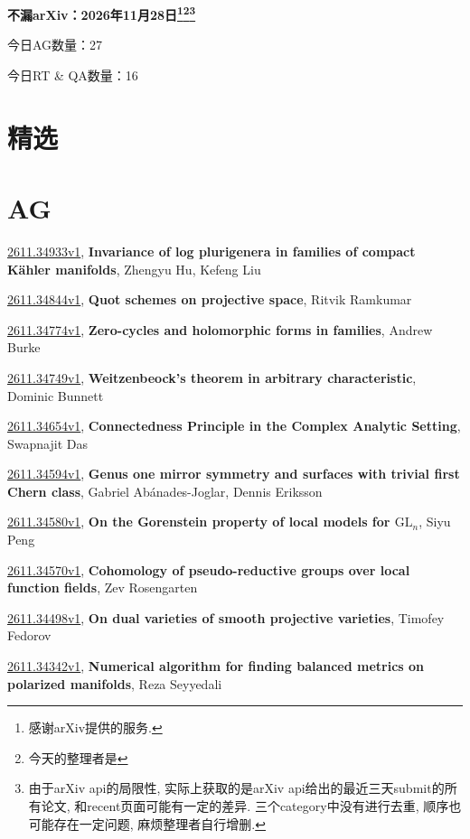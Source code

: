 \documentclass[9pt, a4paper]{article}
\theoremstyle{plain}
\theoremstyle{definition}
\theoremstyle{remark}
\newcommand{\arxiv}[3]{\href{https://arxiv.org/abs/#1}{#1}, \textbf{\textcolor{arxivblue}{#2}}, #3}
\newcommand{\AGnumber}{27}
\newcommand{\RTQAnumber}{16}
\newcommand{\NewestDate}{2026年11月28日}
\newcommand{\todayarXiver}{} %
\begin{document}
\begin{center}
    \Huge\textbf{不漏arXiv：\NewestDate\footnote{感谢arXiv提供的服务.}\footnote{今天的整理者是\todayarXiver}\footnote{由于arXiv api的局限性, 实际上获取的是arXiv api给出的最近三天submit的所有论文, 和recent页面可能有一定的差异. 三个category中没有进行去重, 顺序也可能存在一定问题, 麻烦整理者自行增删.}} \\
\end{center}

\setcounter{section}{-1}

\begin{center}
    今日AG数量：\AGnumber
    
    今日RT \& QA数量：\RTQAnumber
    
\end{center}


\section{精选}


\section{AG}
\arxiv{2611.34933v1}{Invariance of log plurigenera in families of compact Kähler manifolds}{Zhengyu Hu, Kefeng Liu}

\arxiv{2611.34844v1}{Quot schemes on projective space}{Ritvik Ramkumar}

\arxiv{2611.34774v1}{Zero-cycles and holomorphic forms in families}{Andrew Burke}

\arxiv{2611.34749v1}{Weitzenbeock's theorem in arbitrary characteristic}{Dominic Bunnett}

\arxiv{2611.34654v1}{Connectedness Principle in the Complex Analytic Setting}{Swapnajit Das}

\arxiv{2611.34594v1}{Genus one mirror symmetry and surfaces with trivial first Chern class}{Gabriel Abánades-Joglar, Dennis Eriksson}

\arxiv{2611.34580v1}{On the Gorenstein property of local models for $\mathrm{GL}_n$}{Siyu Peng}

\arxiv{2611.34570v1}{Cohomology of pseudo-reductive groups over local function fields}{Zev Rosengarten}

\arxiv{2611.34498v1}{On dual varieties of smooth projective varieties}{Timofey Fedorov}

\arxiv{2611.34342v1}{Numerical algorithm for finding balanced metrics on polarized manifolds}{Reza Seyyedali}
\end{document}
